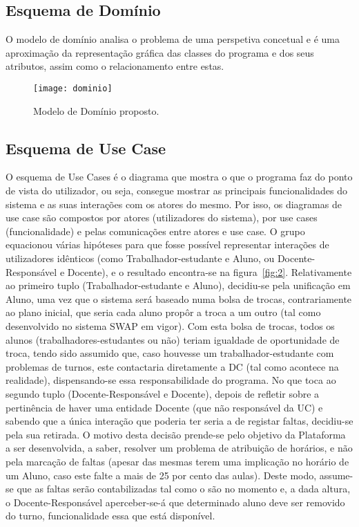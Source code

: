 \documentclass[a4paper]{article}
\begin{document}
\pagebreak
\subsection{Esquema de Domínio}
\hspace{3mm}O modelo de domínio analisa o problema de uma perspetiva concetual e é uma aproximação da representação gráfica das classes do programa e dos seus atributos, assim como o relacionamento entre estas.


\begin{figure}[h!]
\centering
\texttt{[image: dominio]}
\caption{Modelo de Domínio proposto.}
\label{fig:1}
\end{figure}


\subsection{Esquema de Use Case}

\hspace{3mm}O esquema de Use Cases é o diagrama que mostra o que o programa faz do ponto de vista do utilizador, ou seja, consegue mostrar as principais funcionalidades do sistema e as suas interações com os atores do mesmo. Por isso, os diagramas de use case são compostos por atores (utilizadores do sistema), por use cases (funcionalidade) e pelas comunicações entre atores e use case.
O grupo equacionou várias hipóteses para que fosse possível representar interações de utilizadores idênticos (como Trabalhador-estudante e Aluno, ou Docente-Responsável e Docente), e o resultado encontra-se na figura~\ref{fig:2}. Relativamente ao primeiro tuplo (Trabalhador-estudante e Aluno), decidiu-se pela unificação em Aluno, uma vez que o sistema será baseado numa bolsa de trocas, contrariamente ao plano inicial, que seria cada aluno propôr a troca a um outro (tal como desenvolvido no sistema SWAP em vigor). Com esta bolsa de trocas, todos os alunos (trabalhadores-estudantes ou não) teriam igualdade de oportunidade de troca, tendo sido assumido que, caso houvesse um trabalhador-estudante com problemas de turnos, este contactaria diretamente a DC (tal como acontece na realidade), dispensando-se essa responsabilidade do programa. No que toca ao segundo tuplo (Docente-Responsável e Docente), depois de refletir sobre a pertinência de haver uma entidade Docente (que não responsável da UC) e sabendo que a única interação que poderia ter seria a de registar faltas, decidiu-se pela sua retirada. O motivo desta decisão prende-se pelo objetivo da Plataforma a ser desenvolvida, a saber, resolver um problema de atribuição de horários, e não pela marcação de faltas (apesar das mesmas terem uma implicação no horário de um Aluno, caso este falte a mais de 25 por cento das aulas). Deste modo, assume-se que as faltas serão contabilizadas tal como o são no momento e, a dada altura, o Docente-Responsável aperceber-se-á que determinado aluno deve ser removido do turno, funcionalidade essa que está disponível.
\end{document}
